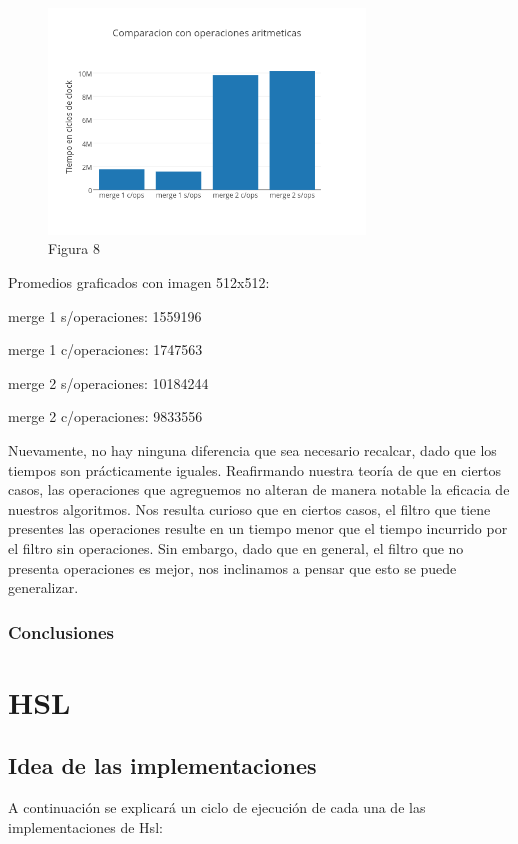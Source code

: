 \documentclass[a4paper]{article}
\begin{document}
\begin{figure}[h]
  \centering
    \includegraphics[width=0.75\textwidth]{imagenes/ComparacionConOperacionesAritmeticasMergeColores.png}
  \caption{Figura 8}
  \label{fig:graficomerge4}
\end{figure}
 \FloatBarrier

Promedios graficados con imagen 512x512:

merge 1 s/operaciones: 1559196

merge 1 c/operaciones: 1747563

merge 2 s/operaciones: 10184244

merge 2 c/operaciones: 9833556



Nuevamente, no hay ninguna diferencia que sea necesario recalcar, dado que los tiempos son prácticamente iguales. Reafirmando nuestra teoría de que en ciertos casos, las operaciones que agreguemos no alteran de manera notable la eficacia de nuestros algoritmos.
Nos resulta curioso que en ciertos casos, el filtro que tiene presentes las operaciones resulte en un tiempo menor que el tiempo incurrido por el filtro sin operaciones. Sin embargo, dado que en general, el filtro que no presenta operaciones es mejor, nos inclinamos a pensar que esto se puede generalizar.


\subsubsection{Conclusiones}


\newpage

\section{HSL}

\subsection{Idea de las implementaciones}
A continuación se explicará un ciclo de ejecución de cada una de las implementaciones de Hsl:
\end{document}
